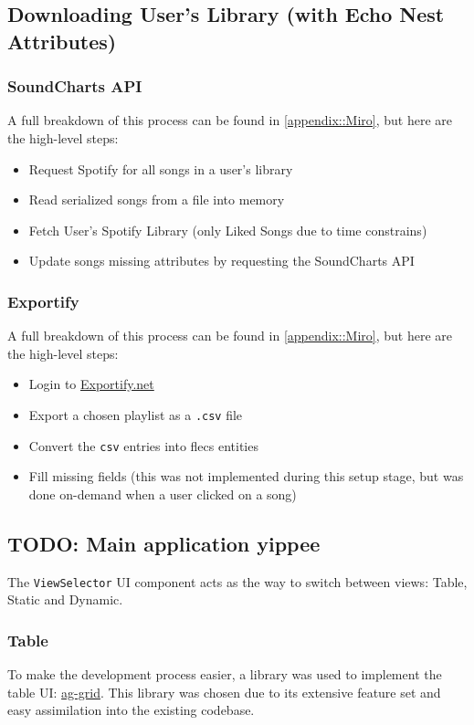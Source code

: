 \subsection{Downloading User's Library (with Echo Nest Attributes)}
\subsubsection{SoundCharts API}
A full breakdown of this process can be found in \ref{appendix::Miro}, but here are the high-level steps:\begin{itemize}
    \item Request Spotify for all songs in a user's library
    \item Read serialized songs from a file into memory
    \item Fetch User's Spotify Library (only Liked Songs due to time constrains)
    \item Update songs missing attributes by requesting the SoundCharts API
\end{itemize}

\subsubsection{Exportify}
A full breakdown of this process can be found in \ref{appendix::Miro}, but here are the high-level steps:\begin{itemize}
    \item Login to \href{https://exportify.net/}{Exportify.net}
    \item Export a chosen playlist as a \texttt{.csv} file
    \item Convert the \texttt{csv} entries into flecs entities
    \item Fill missing fields (this was not implemented during this setup stage, but was done on-demand when a user clicked on a song)
\end{itemize}

\subsection{TODO: Main application yippee}
The \texttt{ViewSelector} UI component acts as the way to switch between views: Table, Static and Dynamic.

\subsubsection{Table}
To make the development process easier, a library was used to implement the table UI: \href{https://www.ag-grid.com/react-data-grid/}{ag-grid}. This library was chosen due to its extensive feature set and easy assimilation into the existing codebase.

